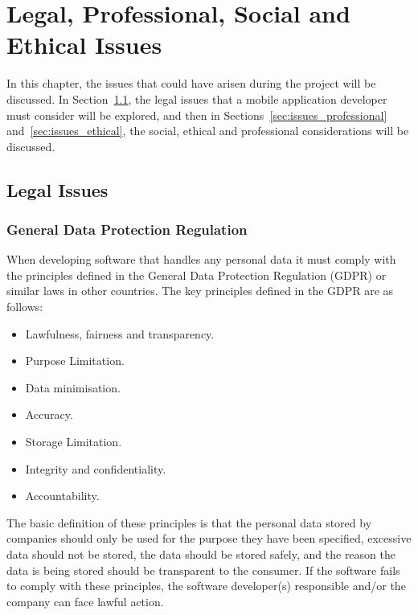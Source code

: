 \chapter{Legal, Professional, Social and Ethical Issues}
	\label{chap:legal_social_ethical_issues}
	In this chapter, the issues that could have arisen during the project will be discussed.  In Section~\ref{sec:issues_legal}, the legal issues that a mobile application developer must consider will be explored, and then in Sections~\ref{sec:issues_professional} and~\ref{sec:issues_ethical}, the social, ethical and professional considerations will be discussed.
	
	\section{Legal Issues}
	    \label{sec:issues_legal}
	    \subsection{General Data Protection Regulation}
	    When developing software that handles any personal data it must comply with the principles defined in the General Data Protection Regulation (GDPR) or similar laws in other countries.  The key principles defined in the GDPR are as follows:
	    \begin{itemize}[noitemsep]
	        \item Lawfulness, fairness and transparency.
	        \item Purpose Limitation.
	        \item Data minimisation.
	        \item Accuracy.
	        \item Storage Limitation.
	        \item Integrity and confidentiality.
	        \item Accountability.
	    \end{itemize}
	    \cite{ico_principles}
	    
	    The basic definition of these principles is that the personal data stored by companies should only be used for the purpose they have been specified, excessive data should not be stored, the data should be stored safely, and the reason the data is being stored should be transparent to the consumer.  If the software fails to comply with these principles, the software developer(s) responsible and/or the company can face lawful action.
	    
